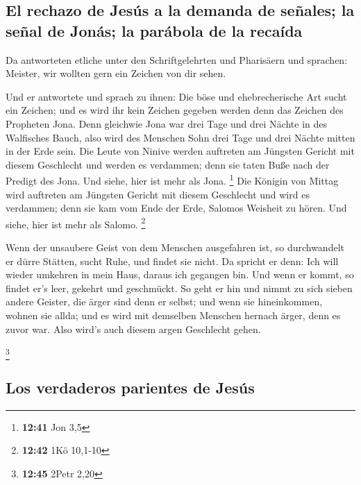 \hypertarget{el-rechazo-de-jesuxfas-a-la-demanda-de-seuxf1ales-la-seuxf1al-de-jonuxe1s-la-paruxe1bola-de-la-recauxedda}{%
\subsection{El rechazo de Jesús a la demanda de señales; la señal de
Jonás; la parábola de la
recaída}\label{el-rechazo-de-jesuxfas-a-la-demanda-de-seuxf1ales-la-seuxf1al-de-jonuxe1s-la-paruxe1bola-de-la-recauxedda}}

 Da antworteten etliche unter den Schriftgelehrten und
Pharisäern und sprachen: Meister, wir wollten gern ein Zeichen von dir
sehen.

 Und er antwortete und sprach zu ihnen: Die böse und
ehebrecherische Art sucht ein Zeichen; und es wird ihr kein Zeichen
gegeben werden denn das Zeichen des Propheten Jona.  Denn
gleichwie Jona war drei Tage und drei Nächte in des Walfisches Bauch,
also wird des Menschen Sohn drei Tage und drei Nächte mitten in der Erde
sein.  Die Leute von Ninive werden auftreten am Jüngsten
Gericht mit diesem Geschlecht und werden es verdammen; denn sie taten
Buße nach der Predigt des Jona. Und siehe, hier ist mehr als Jona.
\footnote{\textbf{12:41} Jon 3,5}  Die Königin von Mittag
wird auftreten am Jüngsten Gericht mit diesem Geschlecht und wird es
verdammen; denn sie kam vom Ende der Erde, Salomos Weisheit zu hören.
Und siehe, hier ist mehr als Salomo. \footnote{\textbf{12:42} 1Kö
  10,1-10}

 Wenn der unsaubere Geist von dem Menschen ausgefahren
ist, so durchwandelt er dürre Stätten, sucht Ruhe, und findet sie nicht.
 Da spricht er denn: Ich will wieder umkehren in mein
Haus, daraus ich gegangen bin. Und wenn er kommt, so findet er's leer,
gekehrt und geschmückt.  So geht er hin und nimmt zu sich
sieben andere Geister, die ärger sind denn er selbst; und wenn sie
hineinkommen, wohnen sie allda; und es wird mit demselben Menschen
hernach ärger, denn es zuvor war. Also wird's auch diesem argen
Geschlecht gehen.

\footnote{\textbf{12:45} 2Petr 2,20}

\hypertarget{los-verdaderos-parientes-de-jesuxfas}{%
\subsection{Los verdaderos parientes de
Jesús}\label{los-verdaderos-parientes-de-jesuxfas}}

